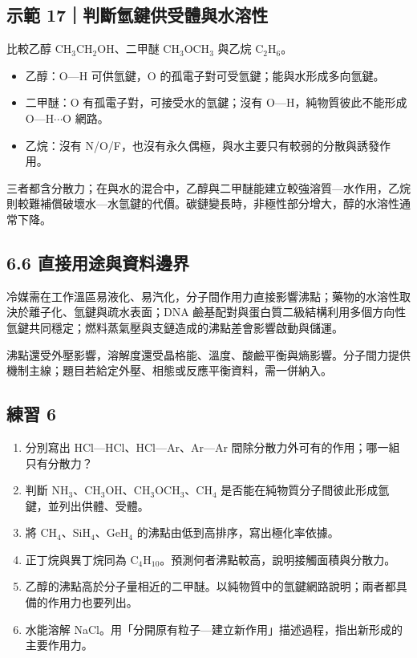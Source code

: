 \documentclass[11pt,a4paper]{article}
\providecommand{\tightlist}{%
  \setlength{\itemsep}{0pt}\setlength{\parskip}{0pt}}
\begin{document}
\begin{HandoutWorkedExample}

\subsection{示範 17｜判斷氫鍵供受體與水溶性}\label{ux793aux7bc4-17ux5224ux65b7ux6c2bux9375ux4f9bux53d7ux9ad4ux8207ux6c34ux6eb6ux6027}

比較乙醇 CH\(_3\)CH\(_2\)OH、二甲醚 CH\(_3\)OCH\(_3\) 與乙烷 C\(_2\)H\(_6\)。

\begin{itemize}
\tightlist
\item
  乙醇：O---H 可供氫鍵，O 的孤電子對可受氫鍵；能與水形成多向氫鍵。
\item
  二甲醚：O 有孤電子對，可接受水的氫鍵；沒有 O---H，純物質彼此不能形成 O---H\(\cdots\)O 網路。
\item
  乙烷：沒有 N/O/F，也沒有永久偶極，與水主要只有較弱的分散與誘發作用。
\end{itemize}

三者都含分散力；在與水的混合中，乙醇與二甲醚能建立較強溶質---水作用，乙烷則較難補償破壞水---水氫鍵的代價。碳鏈變長時，非極性部分增大，醇的水溶性通常下降。

\end{HandoutWorkedExample}

\subsection{6.6 直接用途與資料邊界}\label{ux76f4ux63a5ux7528ux9014ux8207ux8cc7ux6599ux908aux754c}

冷媒需在工作溫區易液化、易汽化，分子間作用力直接影響沸點；藥物的水溶性取決於離子化、氫鍵與疏水表面；DNA 鹼基配對與蛋白質二級結構利用多個方向性氫鍵共同穩定；燃料蒸氣壓與支鏈造成的沸點差會影響啟動與儲運。

沸點還受外壓影響，溶解度還受晶格能、溫度、酸鹼平衡與熵影響。分子間力提供機制主線；題目若給定外壓、相態或反應平衡資料，需一併納入。

\subsection{練習 6}\label{ux7df4ux7fd2-6}

\begin{enumerate}
\def\labelenumi{\arabic{enumi}.}
\tightlist
\item
  分別寫出 HCl---HCl、HCl---Ar、Ar---Ar 間除分散力外可有的作用；哪一組只有分散力？
\item
  判斷 NH\(_3\)、CH\(_3\)OH、CH\(_3\)OCH\(_3\)、CH\(_4\) 是否能在純物質分子間彼此形成氫鍵，並列出供體、受體。
\item
  將 CH\(_4\)、SiH\(_4\)、GeH\(_4\) 的沸點由低到高排序，寫出極化率依據。
\item
  正丁烷與異丁烷同為 C\(_4\)H\(_{10}\)。預測何者沸點較高，說明接觸面積與分散力。
\item
  乙醇的沸點高於分子量相近的二甲醚。以純物質中的氫鍵網路說明；兩者都具備的作用力也要列出。
\item
  水能溶解 NaCl。用「分開原有粒子---建立新作用」描述過程，指出新形成的主要作用力。
\end{enumerate}
\end{document}
